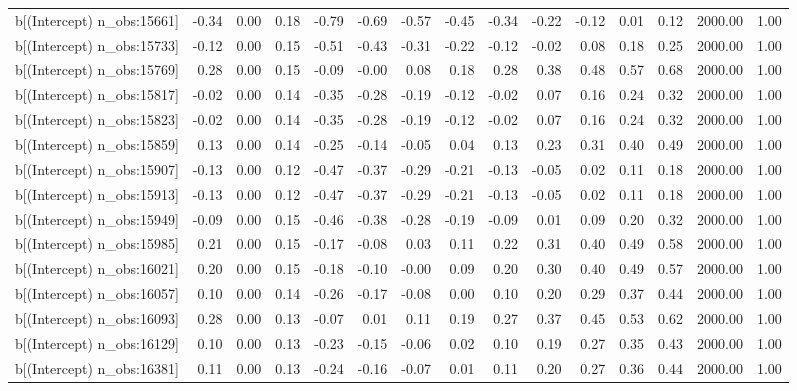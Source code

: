 \begin{table}[ht]
\begin{tabular}{rrrrrrrrrrrrrrr}
  b[(Intercept) n\_obs:15661] & -0.34 & 0.00 & 0.18 & -0.79 & -0.69 & -0.57 & -0.45 & -0.34 & -0.22 & -0.12 & 0.01 & 0.12 & 2000.00 & 1.00 \\ 
  b[(Intercept) n\_obs:15733] & -0.12 & 0.00 & 0.15 & -0.51 & -0.43 & -0.31 & -0.22 & -0.12 & -0.02 & 0.08 & 0.18 & 0.25 & 2000.00 & 1.00 \\ 
  b[(Intercept) n\_obs:15769] & 0.28 & 0.00 & 0.15 & -0.09 & -0.00 & 0.08 & 0.18 & 0.28 & 0.38 & 0.48 & 0.57 & 0.68 & 2000.00 & 1.00 \\ 
  b[(Intercept) n\_obs:15817] & -0.02 & 0.00 & 0.14 & -0.35 & -0.28 & -0.19 & -0.12 & -0.02 & 0.07 & 0.16 & 0.24 & 0.32 & 2000.00 & 1.00 \\ 
  b[(Intercept) n\_obs:15823] & -0.02 & 0.00 & 0.14 & -0.35 & -0.28 & -0.19 & -0.12 & -0.02 & 0.07 & 0.16 & 0.24 & 0.32 & 2000.00 & 1.00 \\ 
  b[(Intercept) n\_obs:15859] & 0.13 & 0.00 & 0.14 & -0.25 & -0.14 & -0.05 & 0.04 & 0.13 & 0.23 & 0.31 & 0.40 & 0.49 & 2000.00 & 1.00 \\ 
  b[(Intercept) n\_obs:15907] & -0.13 & 0.00 & 0.12 & -0.47 & -0.37 & -0.29 & -0.21 & -0.13 & -0.05 & 0.02 & 0.11 & 0.18 & 2000.00 & 1.00 \\ 
  b[(Intercept) n\_obs:15913] & -0.13 & 0.00 & 0.12 & -0.47 & -0.37 & -0.29 & -0.21 & -0.13 & -0.05 & 0.02 & 0.11 & 0.18 & 2000.00 & 1.00 \\ 
  b[(Intercept) n\_obs:15949] & -0.09 & 0.00 & 0.15 & -0.46 & -0.38 & -0.28 & -0.19 & -0.09 & 0.01 & 0.09 & 0.20 & 0.32 & 2000.00 & 1.00 \\ 
  b[(Intercept) n\_obs:15985] & 0.21 & 0.00 & 0.15 & -0.17 & -0.08 & 0.03 & 0.11 & 0.22 & 0.31 & 0.40 & 0.49 & 0.58 & 2000.00 & 1.00 \\ 
  b[(Intercept) n\_obs:16021] & 0.20 & 0.00 & 0.15 & -0.18 & -0.10 & -0.00 & 0.09 & 0.20 & 0.30 & 0.40 & 0.49 & 0.57 & 2000.00 & 1.00 \\ 
  b[(Intercept) n\_obs:16057] & 0.10 & 0.00 & 0.14 & -0.26 & -0.17 & -0.08 & 0.00 & 0.10 & 0.20 & 0.29 & 0.37 & 0.44 & 2000.00 & 1.00 \\ 
  b[(Intercept) n\_obs:16093] & 0.28 & 0.00 & 0.13 & -0.07 & 0.01 & 0.11 & 0.19 & 0.27 & 0.37 & 0.45 & 0.53 & 0.62 & 2000.00 & 1.00 \\ 
  b[(Intercept) n\_obs:16129] & 0.10 & 0.00 & 0.13 & -0.23 & -0.15 & -0.06 & 0.02 & 0.10 & 0.19 & 0.27 & 0.35 & 0.43 & 2000.00 & 1.00 \\ 
  b[(Intercept) n\_obs:16381] & 0.11 & 0.00 & 0.13 & -0.24 & -0.16 & -0.07 & 0.01 & 0.11 & 0.20 & 0.27 & 0.36 & 0.44 & 2000.00 & 1.00 \\ 

\end{tabular}
\end{table}
